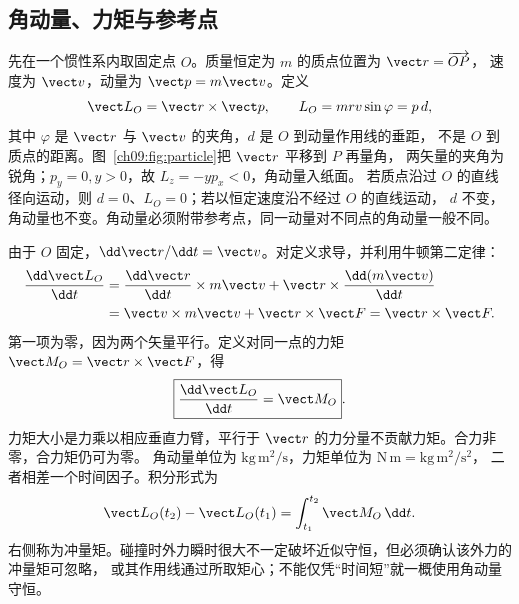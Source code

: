 \subsection{角动量、力矩与参考点}
先在一个惯性系内取固定点 $O$。质量恒定为 $m$ 的质点位置为 $\vect r=\overrightarrow{OP}$，
速度为 $\vect v$，动量为 $\vect p=m\vect v$。定义
\begin{equation}
 \vect L_O=\vect r\times\vect p,\qquad L_O=mrv\sin\varphi=p\,d,
\end{equation}
其中 $\varphi$ 是 $\vect r$ 与 $\vect v$ 的夹角，$d$ 是 $O$ 到动量作用线的垂距，
不是 $O$ 到质点的距离。图~\ref{ch09:fig:particle}把 $\vect r$ 平移到 $P$ 再量角，
两矢量的夹角为锐角；$p_y=0,y>0$，故 $L_z=-yp_x<0$，角动量入纸面。
\particleAngularMomentumDiagram
若质点沿过 $O$ 的直线径向运动，则 $d=0$、$L_O=0$；若以恒定速度沿不经过 $O$ 的直线运动，
$d$ 不变，角动量也不变。角动量必须附带参考点，同一动量对不同点的角动量一般不同。

由于 $O$ 固定，$\dd\vect r/\dd t=\vect v$。对定义求导，并利用牛顿第二定律：
\begin{align}
 \frac{\dd\vect L_O}{\dd t}
 &=\frac{\dd\vect r}{\dd t}\times m\vect v+
   \vect r\times\frac{\dd(m\vect v)}{\dd t}\\
 &=\vect v\times m\vect v+\vect r\times\vect F
 =\vect r\times\vect F.
\end{align}
第一项为零，因为两个矢量平行。定义对同一点的力矩 $\vect M_O=\vect r\times\vect F$，得
\begin{equation}
 \boxed{\frac{\dd\vect L_O}{\dd t}=\vect M_O}.\label{ch09:eq:angular-law}
\end{equation}
力矩大小是力乘以相应垂直力臂，平行于 $\vect r$ 的力分量不贡献力矩。合力非零，合力矩仍可为零。
角动量单位为 $\mathrm{kg\,m^2/s}$，力矩单位为 $\mathrm{N\,m}=\mathrm{kg\,m^2/s^2}$，
二者相差一个时间因子。积分形式为
\begin{equation}
 \vect L_O(t_2)-\vect L_O(t_1)=\int_{t_1}^{t_2}\vect M_O\,\dd t.
\end{equation}
右侧称为冲量矩。碰撞时外力瞬时很大不一定破坏近似守恒，但必须确认该外力的冲量矩可忽略，
或其作用线通过所取矩心；不能仅凭“时间短”就一概使用角动量守恒。

